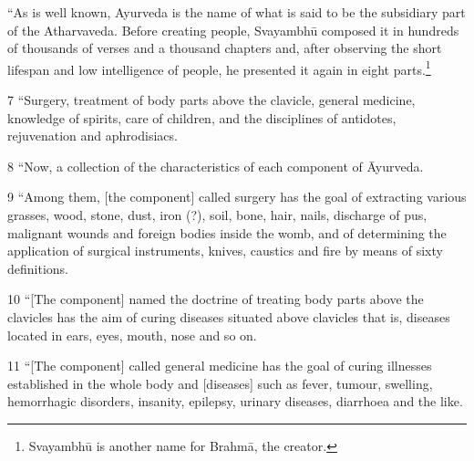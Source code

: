 \begin{translation}
    “As is well known, Ayurveda is the name of what is said to be the subsidiary
    part of the Atharvaveda.   Before creating people, Svayambhū composed it in
    hundreds of thousands of verses and a thousand chapters and, after observing the
    short lifespan and low intelligence of people, he presented it again in eight
    parts.\footnote{Svayambhū is another name for Brahmā, the creator.}
    
    \item[7] “Surgery, treatment of body parts above the clavicle, general medicine, 
    knowledge of spirits, care of children, and the disciplines of antidotes, rejuvenation 
    and aphrodisiacs.
    
    \item[8] “Now,  a collection of the characteristics of each component of 
    Āyurveda.
    
    \item[9] “Among them, [the component] called surgery has the goal of 
    extracting 
    various grasses, wood, stone, dust, iron (?), soil, bone, hair, nails, discharge of 
    pus, malignant wounds and foreign bodies inside the womb, and of determining 
    the application of surgical instruments, knives, caustics and fire by means of 
    sixty definitions.
    
    \item[10] “[The component] named the doctrine of treating body parts above 
    the clavicles has the aim of curing diseases situated above clavicles that is,  
    diseases located in ears, eyes, mouth, nose and so on.
    
    \item[11] “[The component] called general medicine has the goal of curing 
    illnesses established in the whole body and [diseases] such as fever, tumour, 
    swelling, hemorrhagic disorders, insanity, epilepsy, urinary diseases, diarrhoea 
    and the like.
    

\end{translation}
